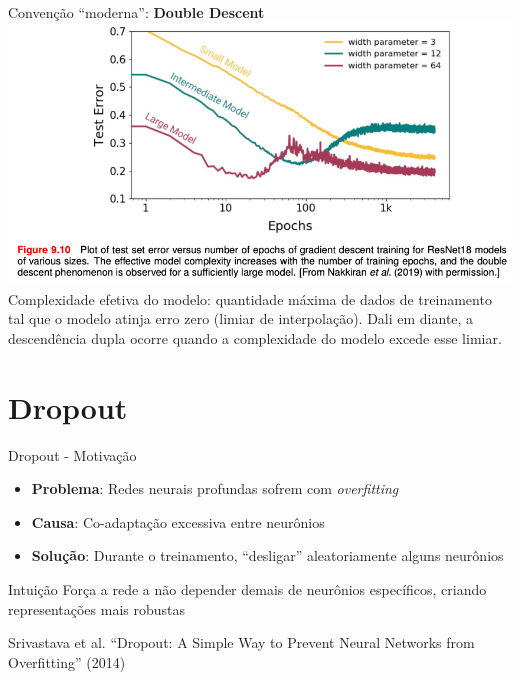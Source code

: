 \documentclass{beamer}
\begin{document}
\begin{frame}{Convenção ``moderna'': \textbf{Double Descent}} 
\includegraphics[width=\textwidth,height=0.8\textheight,keepaspectratio]{imgs/bishop_example/12.png}
    \tiny{Complexidade efetiva do modelo: quantidade máxima de dados de treinamento tal que o modelo atinja erro zero (limiar de interpolação). Dali em diante, a descendência dupla ocorre quando a complexidade do modelo excede esse limiar.}
\end{frame}

\section{Dropout}

\begin{frame}{Dropout - Motivação}
\begin{itemize}
    \item \textbf{Problema}: Redes neurais profundas sofrem com \textit{overfitting}
    \item \textbf{Causa}: Co-adaptação excessiva entre neurônios
    \item \textbf{Solução}: Durante o treinamento, ``desligar'' aleatoriamente alguns neurônios
\end{itemize}

\vspace{0.5cm}

\begin{block}{Intuição}
Força a rede a não depender demais de neurônios específicos, criando representações mais robustas
\end{block}

\vspace{0.3cm}
\tiny{Srivastava et al. ``Dropout: A Simple Way to Prevent Neural Networks from Overfitting'' (2014)} 
\end{frame}
\end{document}
